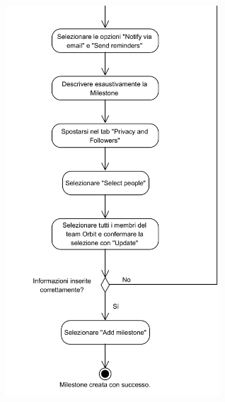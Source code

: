 \begin{center}
	\includegraphics[width=8cm]{../../documenti/NormeDiProgetto/DiagrammiProcedure/CreazioneMilestone2.png}
\end{center}
